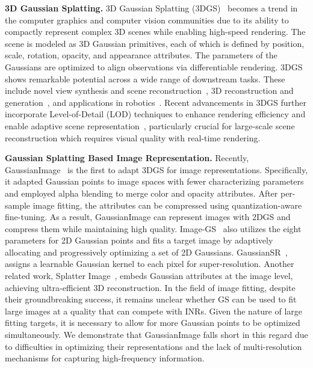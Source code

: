 \noindent\textbf{3D Gaussian Splatting.} 
3D Gaussian Splatting (3DGS)~\cite{kerbl20233d} becomes a trend in the computer graphics and computer vision communities due to its ability to compactly represent complex 3D scenes while enabling high-speed rendering. The scene is modeled as 3D Gaussian primitives, each of which is defined by position, scale, rotation, opacity, and appearance attributes. The parameters of the Gaussians are optimized to align observations via differentiable rendering.
3DGS shows remarkable potential across a wide range of downstream tasks. These include novel view synthesis and scene reconstruction~\cite{kerbl20233d,kerbl2024hierarchical,yu2024mip,huang20242d,zhu2024deformable,zhao2024hfgs,liu2024endogaussian,li2024endosparse}, 3D reconstruction and generation~\cite{tang2024lgm, xu2024grm, szymanowicz2024splatter, tang2023dreamgaussian, liu2024humangaussian, chen2024generalizable}, and applications in robotics~\cite{yugay2023gaussian, lu2024manigaussian,matsuki2024gaussian}.
Recent advancements in 3DGS further incorporate Level-of-Detail (LOD) techniques to enhance rendering efficiency and enable adaptive scene representation~\cite{ren2024octree,kerbl2024hierarchical,yan2024multi}, particularly crucial for large-scale scene reconstruction which requires visual quality with real-time rendering.

\noindent\textbf{Gaussian Splatting Based Image Representation.} 
Recently, GaussianImage~\cite{zhang2024gaussianimage} is the first to adapt 3DGS for image representations. Specifically, it adapted Gaussian points to image spaces with fewer characterizing parameters and employed alpha blending to merge color and opacity attributes. After per-sample image fitting, the attributes can be compressed using quantization-aware fine-tuning. As a result, GaussianImage can represent images with 2DGS and compress them while maintaining high quality. Image-GS~\cite{zhang2024image} also utilizes the eight parameters for 2D Gaussian points and fits a target image by adaptively allocating and progressively optimizing a set of 2D Gaussians. GaussianSR~\cite{hu2024gaussiansr}, assigns a learnable Gaussian kernel to each pixel for super-resolution.
Another related work, Splatter Image~\cite{szymanowicz2024splatter}, embeds Gaussian attributes at the image level, achieving ultra-efficient 3D reconstruction. In the field of image fitting, despite their groundbreaking success, it remains unclear whether GS can be used to fit large images at a quality that can compete with INRs. Given the nature of large fitting targets, it is necessary to allow for more Gaussian points to be optimized simultaneously. We demonstrate that GaussianImage falls short in this regard due to difficulties in optimizing their representations and the lack of multi-resolution mechanisms for capturing high-frequency information.